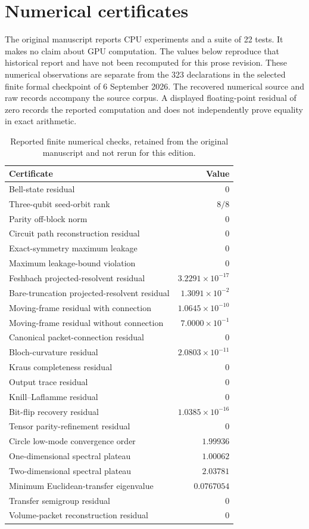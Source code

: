 \section{Numerical certificates}\label{core:section:013}

The original manuscript reports CPU experiments and a suite of 22 tests. It makes no claim about GPU computation. The values below reproduce that historical report and have not been recomputed for this prose revision. These numerical observations are separate from the 323 declarations in the selected finite formal checkpoint of 6 September 2026. The recovered numerical source and raw records accompany the source corpus. A displayed floating-point residual of zero records the reported computation and does not independently prove equality in exact arithmetic.

\begin{table}[htbp]
\centering
\caption{Reported finite numerical checks, retained from the original manuscript and not rerun for this edition.}
\label{core:tab:certificates}
\begin{tabular}{L{0.64\textwidth}r}
\toprule
Certificate & Value\\
\midrule
Bell-state residual & $0$\\
Three-qubit seed-orbit rank & $8/8$\\
Parity off-block norm & $0$\\
Circuit path reconstruction residual & $0$\\
Exact-symmetry maximum leakage & $0$\\
Maximum leakage-bound violation & $0$\\
Feshbach projected-resolvent residual & $3.2291\times10^{-17}$\\
Bare-truncation projected-resolvent residual & $1.3091\times10^{-2}$\\
Moving-frame residual with connection & $1.0645\times10^{-10}$\\
Moving-frame residual without connection & $7.0000\times10^{-1}$\\
Canonical packet-connection residual & $0$\\
Bloch-curvature residual & $2.0803\times10^{-11}$\\
Kraus completeness residual & $0$\\
Output trace residual & $0$\\
Knill--Laflamme residual & $0$\\
Bit-flip recovery residual & $1.0385\times10^{-16}$\\
Tensor parity-refinement residual & $0$\\
Circle low-mode convergence order & $1.99936$\\
One-dimensional spectral plateau & $1.00062$\\
Two-dimensional spectral plateau & $2.03781$\\
Minimum Euclidean-transfer eigenvalue & $0.0767054$\\
Transfer semigroup residual & $0$\\
Volume-packet reconstruction residual & $0$\\
\bottomrule
\end{tabular}
\end{table}

